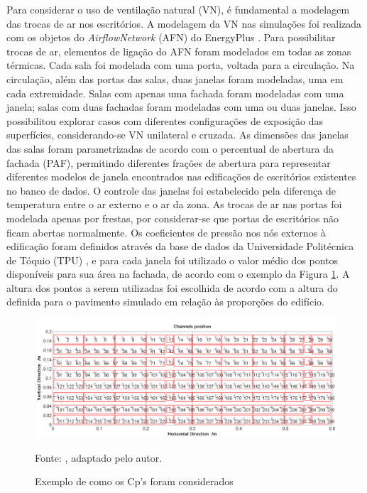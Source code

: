 \documentclass[brazil,hardcopy,openany,a5paper]{ufscthesis}
\begin{document}
		Para considerar o uso de ventilação natural (VN), é fundamental a modelagem das trocas de ar nos escritórios. A modelagem da VN nas simulações foi realizada com os objetos do \textit{AirflowNetwork} (AFN) do EnergyPlus \cite{EnergyPlus2018}.
		Para possibilitar trocas de ar, elementos de ligação do AFN foram modelados em todas as zonas térmicas. 
		Cada sala foi modelada com uma porta, voltada para a circulação.
		Na circulação, além das portas das salas, duas janelas foram modeladas, uma em cada extremidade. 
		Salas com apenas uma fachada foram modeladas com uma janela; salas com duas fachadas foram modeladas com uma ou duas janelas. Isso possibilitou explorar casos com diferentes configurações de exposição das superfícies, considerando-se VN unilateral e cruzada.		
		As dimensões das janelas das salas foram parametrizadas de acordo com o percentual de abertura da fachada (PAF), permitindo diferentes frações de abertura para representar diferentes modelos de janela encontrados nas edificações de escritórios existentes no banco de dados.
		O controle das janelas foi estabelecido pela diferença de temperatura entre o ar externo e o ar da zona. As trocas de ar nas portas foi modelada apenas por frestas, por considerar-se que portas de escritórios não ficam abertas normalmente.
		Os coeficientes de pressão nos nós externos à edificação foram definidos através da base de dados da Universidade Politécnica de Tóquio (TPU) \cite{TPU2018}, e para cada janela foi utilizado o valor médio dos pontos disponíveis para sua área na fachada, de acordo com o exemplo da Figura \ref{fig:tpuwindows}. A altura dos pontos a serem utilizadas foi escolhida de acordo com a altura do definida para o pavimento simulado em relação às proporções do edifício.
		
		\begin{figure}[h]
			\centering
			\caption{Exemplo de como os Cp’s foram considerados}
			\includegraphics[width=1\linewidth]{img/tpu_windows.png}
			\label{fig:tpuwindows}
			\begin{flushleft}
				Fonte:  \cite{TPU2018}, adaptado pelo autor.
			\end{flushleft}
		\end{figure}
		
\end{document}
